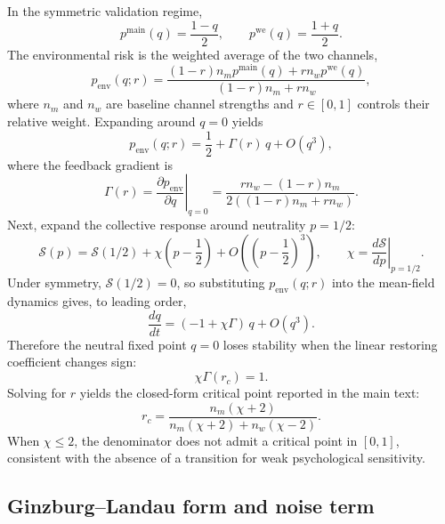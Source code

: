 In the symmetric validation regime,
\begin{equation}
p^{\text{main}}(q)=\frac{1-q}{2},\qquad p^{\text{we}}(q)=\frac{1+q}{2}.
\end{equation}
The environmental risk is the weighted average of the two channels,
\begin{equation}
p_{\text{env}}(q;r)=\frac{(1-r)n_m p^{\text{main}}(q)+r n_w p^{\text{we}}(q)}{(1-r)n_m+r n_w},
\end{equation}
where $n_m$ and $n_w$ are baseline channel strengths and $r\in[0,1]$ controls their relative weight. Expanding around $q=0$ yields
\begin{equation}
p_{\text{env}}(q;r)=\frac{1}{2}+\Gamma(r)\,q+O(q^3),
\end{equation}
where the feedback gradient is
\begin{equation}
\Gamma(r)=\left.\frac{\partial p_{\text{env}}}{\partial q}\right|_{q=0}
=\frac{r n_w-(1-r)n_m}{2\left((1-r)n_m+r n_w\right)}.
\end{equation}
Next, expand the collective response around neutrality $p=1/2$:
\begin{equation}
\mathcal{S}(p)=\mathcal{S}(1/2)+\chi\left(p-\frac{1}{2}\right)+O\!\left(\left(p-\frac{1}{2}\right)^3\right),\qquad
\chi=\left.\frac{d\mathcal{S}}{dp}\right|_{p=1/2}.
\end{equation}
Under symmetry, $\mathcal{S}(1/2)=0$, so substituting $p_{\text{env}}(q;r)$ into the mean-field dynamics gives, to leading order,
\begin{equation}
\frac{dq}{dt}=(-1+\chi\Gamma)\,q+O(q^3).
\end{equation}
Therefore the neutral fixed point $q=0$ loses stability when the linear restoring coefficient changes sign:
\begin{equation}
\chi\Gamma(r_c)=1.
\end{equation}
Solving for $r$ yields the closed-form critical point reported in the main text:
\begin{equation}
r_c=\frac{n_m(\chi+2)}{n_m(\chi+2)+n_w(\chi-2)}.
\end{equation}
When $\chi\le 2$, the denominator does not admit a critical point in $[0,1]$, consistent with the absence of a transition for weak psychological sensitivity.

\subsection{Ginzburg--Landau form and noise term}

